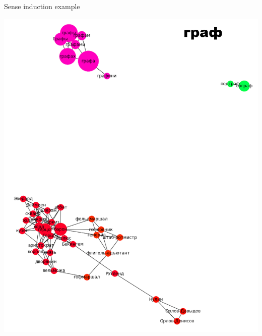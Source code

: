 \begin{frame}{ Sense induction  example}

 \begin{center}
  	\includegraphics[height=0.68\textheight]{figures/graph}
  \end{center}
  
\end{frame}


